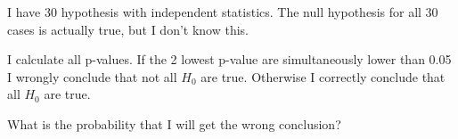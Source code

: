 
\begin{question}
I have 30 hypothesis with independent statistics. The null hypothesis for all 30
cases is actually true, but I don't know this.

I calculate all p-values.
If the 2 lowest p-value are simultaneously lower than 0.05 I wrongly conclude that not all \(H_0\) are true. Otherwise I correctly conclude that all \(H_0\) are true.

What is the probability that I will get the wrong conclusion?
\end{question}


